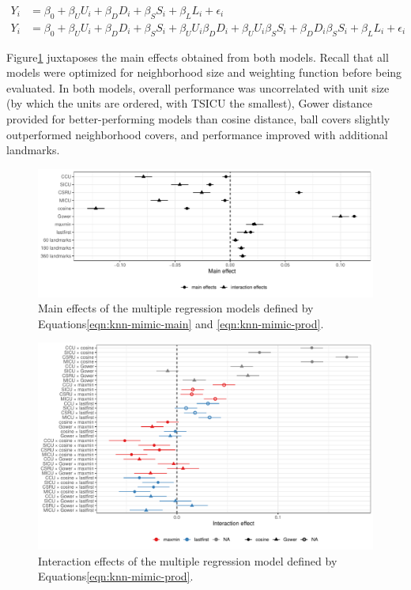 \documentclass{article}
\begin{document}
\begin{align}
\label{eqn:knn-mimic-main}
Y_i &= \beta_0 + \beta_U U_i + \beta_D D_i + \beta_S S_i + \beta_L L_i + \epsilon_i \\
\label{eqn:knn-mimic-prod}
Y_i &= \beta_0 + \beta_U U_i + \beta_D D_i + \beta_S S_i + \beta_U U_i \beta_D D_i + \beta_U U_i \beta_S S_i + \beta_D D_i \beta_S S_i + \beta_L L_i + \epsilon_i
\end{align}

Figure\nbs\ref{fig:knn-mimic-main} juxtaposes the main effects obtained
from both models. Recall that all models were optimized for neighborhood
size and weighting function before being evaluated. In both models,
overall performance was uncorrelated with unit size (by which the units
are ordered, with TSICU the smallest), Gower distance provided for
better-performing models than cosine distance, ball covers slightly
outperformed neighborhood covers, and performance improved with
additional landmarks.

\begin{figure}
\includegraphics[width=\textwidth]{knn-compare-main}
\caption{
Main effects of the multiple regression models defined by Equations\nbs\ref{eqn:knn-mimic-main} and \ref{eqn:knn-mimic-prod}.
\label{fig:knn-mimic-main}
}
\end{figure}

\begin{figure}
\includegraphics[width=\textwidth]{knn-compare-prod}
\caption{
Interaction effects of the multiple regression model defined by Equations\nbs\ref{eqn:knn-mimic-prod}.
\label{fig:knn-mimic-prod}
}
\end{figure}
\end{document}
